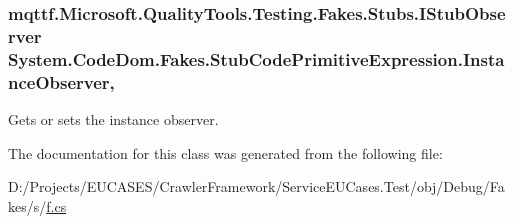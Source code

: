 \hypertarget{class_system_1_1_code_dom_1_1_fakes_1_1_stub_code_primitive_expression_a1794b6c251cbce59b4da36860410eaac}{
\subsubsection[{Instance\-Observer}]{\setlength{\rightskip}{0pt plus 5cm}mqttf.\-Microsoft.\-Quality\-Tools.\-Testing.\-Fakes.\-Stubs.\-I\-Stub\-Observer System.\-Code\-Dom.\-Fakes.\-Stub\-Code\-Primitive\-Expression.\-Instance\-Observer\hspace{0.3cm}{\ttfamily [get]}, {\ttfamily [set]}}}\label{class_system_1_1_code_dom_1_1_fakes_1_1_stub_code_primitive_expression_a1794b6c251cbce59b4da36860410eaac}


Gets or sets the instance observer.



The documentation for this class was generated from the following file\-:\begin{DoxyCompactItemize}
\item 
D\-:/\-Projects/\-E\-U\-C\-A\-S\-E\-S/\-Crawler\-Framework/\-Service\-E\-U\-Cases.\-Test/obj/\-Debug/\-Fakes/s/\hyperlink{s_2f_8cs}{f.\-cs}\end{DoxyCompactItemize}
